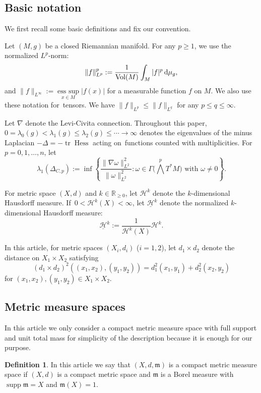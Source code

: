 \documentclass[10pt,a4paper]{amsart}
\numberwithin{equation}{section}
\theoremstyle{definition}
\newtheorem{Def}[Thm]{Definition}
\newcommand{\tr}{\operatorname{tr}}
\newcommand{\Vol}{\operatorname{Vol}}
\newcommand{\Card}{\operatorname{Card}}
\newcommand{\supp}{\operatorname{supp}}
\newcommand{\Hess}{\operatorname{Hess}}
\newcommand{\R}{\mathbb{R}}
\newcommand{\mf}{\mathfrak{m}}
\newcommand{\Ha}{\mathcal{H}}
\newcommand{\nHa}{\underline{\mathcal{H}}}
\begin{document}
\subsection{Basic notation}
We first recall some basic definitions and fix our convention.


Let $(M,g)$ be a closed Riemannian manifold.
For any $p\geq 1$, we use the normalized $L^p$-norm:
\begin{gather*}
\|f\|_{L^p}^p:=\frac{1}{\Vol(M)}\int_M |f|^p\,{\rm d}\mu_g,
\end{gather*}
and $\|f\|_{L^\infty}:=\mathop{\mathrm{ess~sup}}\limits_{x\in M}|f(x)|$ for a measurable function $f$ on $M$. We also use these notation for~tensors.
We have $\|f\|_{L^p}\leq \|f\|_{L^q}$ for any $p\leq q \leq \infty$.

Let $\nabla$ denote the Levi-Civita connection.
Throughout this paper,
 $0=\lambda_0(g)< \lambda_1(g) \leq \lambda_2(g) \leq\cdots \to \infty$
denotes the eigenvalues of the minus Laplacian $-\Delta=-\tr\Hess$ acting on~functions counted with multiplicities.
For $p=0,1,\ldots, n$, let
\[
\lambda_1(\Delta_{C,p}):=\inf\left\{\frac{\|\nabla \omega\|_{L^2}^2}{\|\omega\|_{L^2}^2}\colon \omega\in\Gamma\Big(\bigwedge^p T^\ast M\Big) \text{ with }\omega\neq 0\right\} .
\]

For metric space $(X,d)$ and $k\in\R_{\geq 0}$, let $\Ha^k$ denote the $k$-dimensional Hausdorff measure.
If~$0<\Ha^k(X)<\infty$, let $\nHa^k$ denote the normalized $k$-dimensional Hausdorff measure:
\[
\nHa^k:=\frac{1}{\Ha^k(X)}\Ha^k.
\]

In this article, for metric spaces $(X_i,d_i)$ ($i=1,2$), let $d_1\times d_2$ denote the distance on $X_1\times X_2$ satisfying
\[
(d_1\times d_2)^2\left((x_1,x_2),(y_1,y_2)\right)=d_1^2(x_1,y_1)+d_2^2(x_2,y_2)
\]
for $(x_1,x_2),(y_1,y_2)\in X_1\times X_2$.

\subsection{Metric measure spaces}
In this article we only consider a compact metric measure space with full support and unit total mass for simplicity of the description because it is enough for our purpose.
\begin{Def}
In this article we say that $(X,d,\mf)$ is a compact metric measure space if $(X,d)$ is a compact metric space and $\mf$ is a Borel measure with $\supp \mf =X$ and $\mf(X)=1$.
\end{Def}
\end{document}
